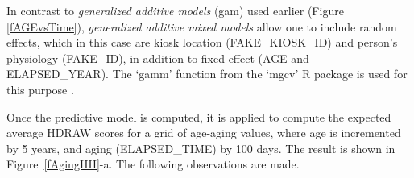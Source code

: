 \documentclass{cta-author}%
\newcommand{\cmt}[1]{}
\begin{document}
In contrast to {\it generalized additive  models} (gam)  used earlier (Figure \ref{fAGEvsTime}), 
{\it generalized additive mixed models} allow one to include random effects, which in this case are kiosk location (FAKE\_KIOSK\_ID) and person's physiology (FAKE\_ID), in addition to fixed effect (AGE and ELAPSED\_YEAR).
The `gamm' function from the `mgcv' R package is used for this purpose \cite{R-gam}.

\cmt{
Using the `mgcv` R package \cite{R-gam}, the relationship between the effects and the output value (HDRAW) is defined by the following 
formula:
{\scriptsize  
\begin{verbatim}  
model = gamm( HDRAW ~ te(ELAPSED_TIME, AGE), data=OPS_XING,
              random=list(FAKE_ID=~1, FAKE_KIOSK_ID=~1) ) 
\end{verbatim}
}


In this formula,  {\tt te()} is used to  apply a tensor product smooth to obtain better smoothing for the function on the marginal values.
}

Once the predictive model is computed, it is applied to compute the  expected average HDRAW scores for a grid of age-aging values,  where age is incremented by 5 years, and aging (ELAPSED\_TIME) by 100 days. The result 
is shown in Figure~\ref{fAgingHH}-a.
The following  observations are made.

\cmt{
shows the  heatmap of  HDNORM scores for different Age at Passage  and different number of years since enrollment (ELAPSED\_YEAR).
The top image shows interpolated (i.e., averaged between adjacent bins) mathematical average of HDNORM for each `age'-`aging' group. 
The bottom image shows average  HDNORM scores for different Age and ELAPSED\_YEAR computed using generalized additive model regression. Data from all kiosks and all cameras are used. 

}
\end{document}
